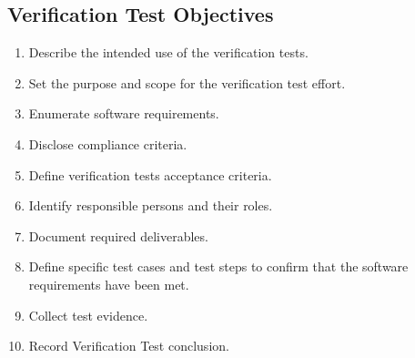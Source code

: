 \subsection{Verification Test Objectives}
\begin{enumerate}
  \item Describe the intended use of the verification tests.
  \item Set the purpose and scope for the verification test effort.
  \item Enumerate software requirements.
  \item Disclose compliance criteria.
  \item Define verification tests acceptance criteria.
  \item Identify responsible persons and their roles.
  \item Document required deliverables.
  \item Define specific test cases and test steps to confirm that the software
    requirements have been met.
  \item Collect test evidence.
  \item Record Verification Test conclusion.
\end{enumerate}


